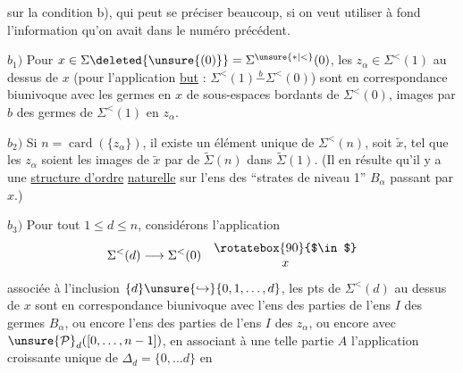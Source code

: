  sur la condition b), qui peut se préciser beaucoup, si on veut utiliser à fond l'information qu'on avait dans le numéro précédent.

$b_1)$ Pour $x\in\Sigma\deleted{\unsure{(0)}}=\Sigma^{\unsure{*|<}}(0)$, les $z_\alpha\in\Sigma^{<}(1)$ au dessus de $x$ (pour l'application \uline{but} : $\Sigma^{<}(1)\overset{b}{-}\Sigma^{<}(0)$) sont en correspondance biunivoque avec les germes  en $x$ de sous-espaces bordants de $\Sigma^{<}(0)$,  images par $b$ des germes de $\Sigma^{<}(1)$ en  $z_\alpha$.

$b_2)$  Si $n=\operatorname{card}(\{z_\alpha\})$, il existe un élément  unique de $\Sigma^{<}(n)$, soit $\widetilde{x}$, tel que les  $z_\alpha$ soient les images de $\widetilde{x}$ par  de $\widetilde\Sigma(n)$ dans $\widetilde\Sigma(1)$.
(Il en résulte qu'il y a une \uline{structure d'ordre}  \uline{naturelle} sur l'ens des ``strates de niveau 1'' $B_\alpha$  passant par $x$.)

 $b_3)$ Pour tout  $1\leq d\leq n$, considérons l'application
\[
\Sigma^{<}(d)\longrightarrow\Sigma^{<}(0)\quad\begin{matrix}\rotatebox{90}{$\in$}\\x\end{matrix}
\]
 associée à l'inclusion  $\{d\}\unsure{\hookrightarrow}\{0,1,\ldots,d\}$, les pts  de $\Sigma^{<}(d)$ au dessus de $x$ sont en correspondance biunivoque avec l'ens des parties  de l'ens \deleted{$\unsure{\Sigma}$} $I$ des germes $B_\alpha$, ou encore l'ens des parties  de l'ens $I$ des $z_\alpha$, ou encore avec $\unsure{\mathcal P}_d([0,\ldots,n-1])$, en associant à une telle partie $A$ l'application  croissante unique de $\Delta_d=\{0,\ldots d\}$ en
